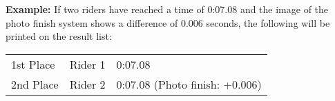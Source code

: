 \textbf{Example:} If two riders have reached a time of 0:07.08 and the image of the photo finish system shows a difference of 0.006 seconds, the following will be printed on the result list:\\
\begin{tabular}{l l l}
1st Place & Rider 1 & 0:07.08 \\
2nd Place & Rider 2 & 0:07.08 (Photo finish: +0.006)\\
\end{tabular}
